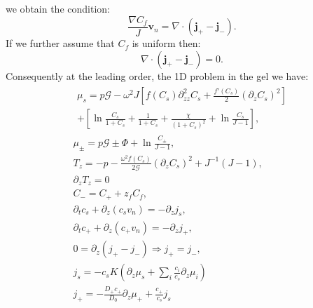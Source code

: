 \documentclass[12pt]{extarticle}
\begin{document}
we obtain the condition:
\begin{equation}
\frac{\nabla C_f}{J}\mathbf{v}_n= \nabla\cdot(\mathbf{j}_+-\mathbf{j}_-).
\end{equation}
If we further assume that $C_f$ is uniform then:
\begin{equation}
\nabla\cdot(\mathbf{j}_+-\mathbf{j}_-)= 0.
\end{equation}
Consequently at the leading order, the 1D problem in the gel we have:
\begin{gather}
\begin{aligned}
\mu_s = p \mathcal{G}  - \omega^2 J \left[f(C_s)\partial_{zz}^2 C_s+\frac{f'(C_s)}{2}\left(\partial_z C_s\right)^2\right]\\
+ \left[\ln \frac{C_s}{1+C_s} + \frac{1}{1+C_s}+\frac{\chi}{(1+C_s)^2} + \ln \frac{C_s}{J-1} \right], 
\end{aligned}\\[2.5mm]
\mu_\pm = p \mathcal{G} \pm \Phi + \ln \frac{C_\pm}{J-1} ,\\
T_z= -p -\frac{\omega^2 f(C_s)}{2\mathcal{G}} (\partial_z C_s)^2+ J^{-1}\left(J-1\right),\\
\partial_z T_z=0\\
C_- = C_+ + z_f C_f,\\
\partial_t c_s + \partial_z (c_s v_n)=- \partial_z j_s,\\
\partial_t c_+ +\partial_z (c_+ v_n)= -\partial_zj_+,\\
0= \partial_z(j_+-j_-) \Rightarrow j_+=j_-,\\
j_s =-c_sK  \left(\partial_z\mu_s +\sum_i \frac{c_i}{c_s} \partial_z \mu_i\right)\\
j_+= - \frac{D_+ c_+}{D_0}\partial_z \mu_+ + \frac{c_+}{c_s}j_s
\end{gather}
\end{document}
